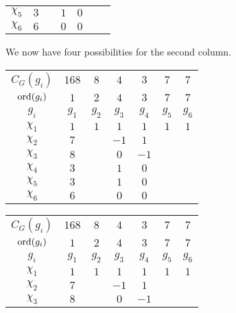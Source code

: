 \begin{boxexample}[Constructing the Character Table of $G = \PSL{2, 7}$]
\begin{table}[H]
\begin{tabular}{|c|cccccc|}
            $\chi_5$ & $3$ & & $1$ & $0$ & & \\
            $\chi_6$ & $6$ & & $0$ & $0$ & & \\
        \end{tabular}
    \end{table}
    We now have four possibilities for the second column. %
    \begin{table}[H]
        \centering
        \begin{subtable}{0.45\linewidth}
            \begin{tabular}{|c|cccccc|}
                $C_G(g_i)$ & $168$ & $8$ & $4$ & $3$ & $7$ & $7$ \\
                $\operatorname{ord}\!\left( g_i \right)$ & $1$ & $2$ & $4$ & $3$ & $7$ & $7$ \\
                $g_i$ & $g_1$ & $g_2$ & $g_3$ & $g_4$ & $g_5$ & $g_6$ \\
                \hline
                $\chi_1$ & $1$ & $1$ & $1$ & $1$ & $1$ & $1$ \\
                $\chi_2$ & $7$ & & $-1$ & $1$ & & \\
                $\chi_3$ & $8$ & & $0$ & $-1$ & & \\
                $\chi_4$ & $3$ & & $1$ & $0$ & & \\
                $\chi_5$ & $3$ & & $1$ & $0$ & & \\
                $\chi_6$ & $6$ & & $0$ & $0$ & & \\
            \end{tabular}
        \end{subtable}
        \hspace{0.05\linewidth}
        \begin{subtable}{0.45\linewidth}
            \begin{tabular}{|c|cccccc|}
                $C_G(g_i)$ & $168$ & $8$ & $4$ & $3$ & $7$ & $7$ \\
                $\operatorname{ord}\!\left( g_i \right)$ & $1$ & $2$ & $4$ & $3$ & $7$ & $7$ \\
                $g_i$ & $g_1$ & $g_2$ & $g_3$ & $g_4$ & $g_5$ & $g_6$ \\
                \hline
                $\chi_1$ & $1$ & $1$ & $1$ & $1$ & $1$ & $1$ \\
                $\chi_2$ & $7$ & & $-1$ & $1$ & & \\
                $\chi_3$ & $8$ & & $0$ & $-1$ & & \\

\end{tabular}
\end{subtable}
\end{table}
\end{boxexample}
